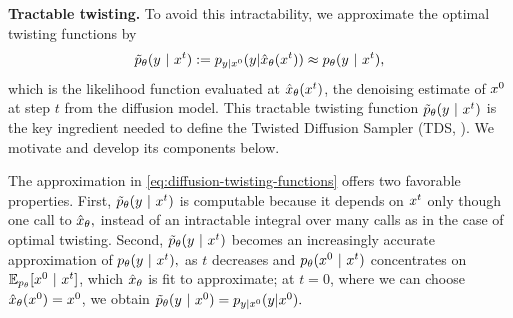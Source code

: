 %

\textbf{Tractable twisting.}
To avoid this intractability, we approximate the optimal twisting functions by
\begin{align}\label{eq:diffusion-twisting-functions}
     \tilde p_\theta(y~\vert~ x^{t}) := p_{y|x^{0}}({ y}|{{\hat x}_\theta (x^{t})})    \approx  p_{\theta} (y ~\vert~ x^{t}),
\end{align}
which is the likelihood function evaluated at ${\hat x}_\theta(x^{t})$, the denoising estimate of $x^{0}$ at step $t$ from the diffusion model.
This tractable twisting function $ \tilde p_\theta(y~\vert~ x^{t})$ is the key ingredient needed to define the Twisted Diffusion Sampler (TDS, ).
We motivate and develop its components below.

The approximation  in \cref{eq:diffusion-twisting-functions} offers two favorable properties.
First, $\tilde p_\theta(y ~\vert~ x^{t})$ is computable because it depends on $x^{t}$ only though one call to ${\hat x}_\theta,$ instead of an intractable integral over many calls as in the case of optimal twisting.
Second, $\tilde p_\theta(y~\vert~ x^{t})$ becomes an increasingly accurate approximation of $p_{\theta}(y ~\vert~ x^{t}),$  as $t$ decreases and $p_{\theta}(x^{0} ~\vert~ x^{t})$ concentrates on $\mathbb{E}_{p_{\theta}}[x^{0} ~\vert~ x^{t}]$, which ${\hat x}_\theta$ is fit to approximate;
at $t=0$, where we can choose ${\hat x}_\theta(x^{0})=x^{0}$, we obtain $\tilde p_\theta(y~\vert~ x^{0}) = p_{y|x^{0}}({y}|{x^{0}}).$



